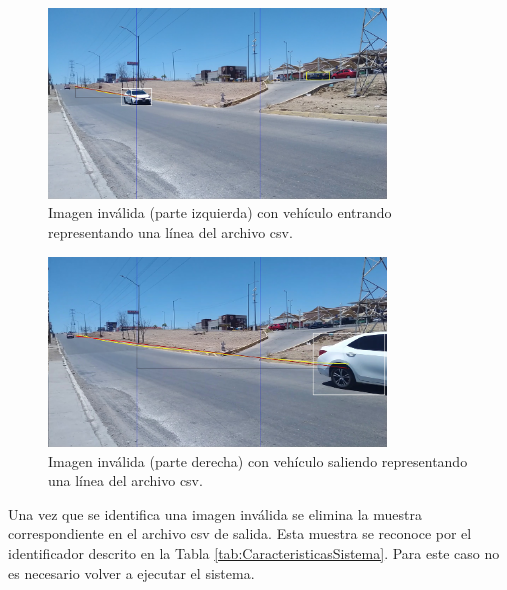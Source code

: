 \begin{figure}[H]
    \centering
    \includegraphics[width=0.8\textwidth]{Metodologia/imgs/Invalido_001.jpg}
    \caption{Imagen inválida (parte izquierda) con vehículo entrando representando una línea del archivo csv.}
    \label{fig:ImagenInvalida_01}
\end{figure}

\begin{figure}[H]
    \centering
    \includegraphics[width=0.8\textwidth]{Metodologia/imgs/Invalido_002.jpg}
    \caption{Imagen inválida (parte derecha) con vehículo saliendo representando una línea del archivo csv.}
    \label{fig:ImagenInvalida_02}
\end{figure}

Una vez que se identifica una imagen inválida se elimina la muestra correspondiente en el archivo csv de salida. Esta muestra se reconoce por el identificador descrito en la Tabla \ref{tab:CaracteristicasSistema}. Para este caso no es necesario volver a ejecutar el sistema.

